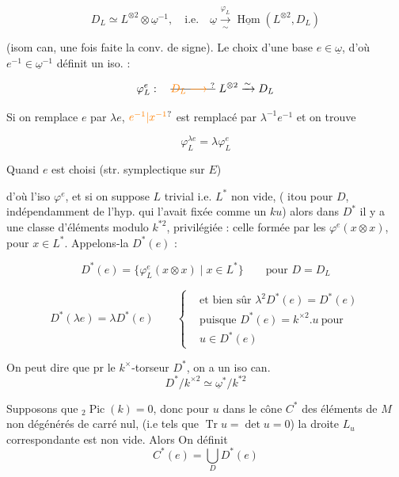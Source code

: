 \[
 D_L\simeq L^{\otimes2}\otimes\underline{\omega}^{-1},\quad
 \text{i.e.}\quad\underline{\omega}\xrightarrow[\sim]{\varphi_L}
 \underline{\operatorname{Hom}}(L^{\otimes2},D_L)
\]

(isom can,  une fois faite la conv. de signe). Le choix d'une base $e\in\underline{\omega}$, d'où $e^{-1}\in\underline{\omega}^{-1}$ définit un iso. :

\[
 \varphi_L^e:\quad\deleted{\unsure{D_L\longrightarrow{}}}\ L^{\otimes2}\xrightarrow{\sim} D_L
\]

Si on remplace $e$ par $\lambda e$, $\unsure{e^{-1}|x^{-1}}$ est remplacé par $\lambda^{-1}e^{-1}$ et on trouve

\[
 \varphi_L^{\lambda e}=\lambda\varphi_L^e
\]

Quand $e$ est choisi (str. symplectique sur $E$)

d'où l'iso $\varphi^e$, et si on suppose $L$ trivial i.e. $L^*$ non vide,  ( itou pour $D$, indépendamment  de l'hyp. qui l'avait fixée comme un $ku$) alors dans $D^*$ il y a une classe d'éléments modulo $k^{*2}$, privilégiée : celle formée par les $\varphi^e(x\otimes x)$, pour $x\in L^*$. Appelons-la $D^*(e)$ : 

\[
 D^*(e)=\{\varphi_L^e(x\otimes x)\mid x\in L^*\}\qquad \text{pour }D=D_L
\]

\[
 D^*(\lambda e)=\lambda D^*(e)\qquad
 \left\{\begin{aligned}
 &\text{et bien sûr }\lambda^2D^*(e)=D^*(e)\\
 &\text{puisque }D^*(e)=k^{\times2}.u\ \text{pour}\\
 &u\in D^*(e)
 \end{aligned}\right.
\]

 On peut dire que pr le $k^\times$-torseur $D^*$, on a un iso can.
\[
 D^*/k^{\times2}\simeq\underline{\omega}^*/k^{*2}
\]

 Supposons que $ {}_2\operatorname{Pic}(k)=0$, donc pour   $u$ dans le cône $C^*$ des éléments de $M$ non dégénérés de carré nul, (i.e tels que $\operatorname{Tr}u=\det u=0$) la droite $L_u$ correspondante est non vide. Alors On définit 
\[
 C^*(e)=\bigcup_D D^*(e)
\]

